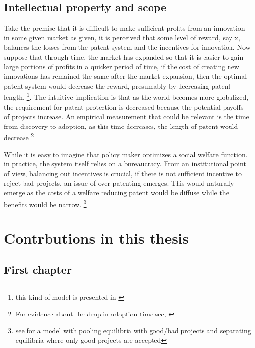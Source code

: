\documentclass[12pt]{article}
\numberwithin{equation}{section}
\begin{document}
\subsection{Intellectual property and scope}

Take the premise that it is difficult to make sufficient profits from an innovation in some given market as given, it is perceived that some level of reward, say x, balances the losses from the patent system and the incentives for innovation. Now suppose that through time, the market has expanded so that it is easier to gain large portions of profits in a quicker period of time, if the cost of creating new innovations has remained the same after the market expansion, then the optimal patent system would decrease the reward, presumably by decreasing patent length. \footnote{this kind of model is presented in \cite{boldrin2009market} }. The intuitive implication is that as the world becomes more globalized, the requirement for patent protection is decreased because the potential payoffs of projects increase. An empirical measurement that could be relevant is the time from discovery to adoption, as this time decreases, the length of patent would decrease \footnote{For evidence about the drop in adoption time see, \cite{comin2006five}}

While it is easy to imagine that policy maker optimizes a social welfare function, in practice, the system itself relies on a bureaucracy. From an institutional point of view, balancing out incentives is crucial, if there is not sufficient incentive to reject bad projects, an issue of over-patenting emerges. This would naturally emerge as the costs of a welfare reducing patent would be diffuse while the benefits would be narrow. \footnote{see \cite{Caillaud2012} for a model with pooling equilibria with good/bad projects and separating equilibria where only good projects are accepted}

\section{Contrbutions in this thesis}

\subsection{First chapter}
\end{document}
